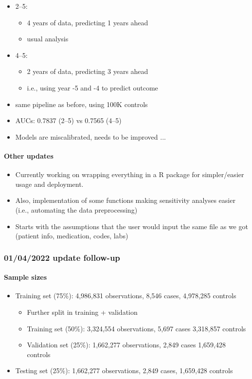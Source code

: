 \documentclass[12pt]{article}
\begin{document}
\begin{itemize}
	\item 2--5: 
	\begin{itemize}
		\item 4 years of data, predicting 1 years ahead
		\item usual analysis
	\end{itemize}
	\item 4--5: 
	\begin{itemize}
		\item 2 years of data, predicting 3 years ahead
		\item i.e., using year -5 and -4 to predict outcome
	\end{itemize}
	\item same pipeline as before, using 100K controls
	\item AUCs: 0.7837 (2--5) vs 0.7565 (4--5)
	\item Models are miscalibrated, needs to be improved ... 
\end{itemize}




\paragraph*{Other updates}

\begin{itemize}
	\item Currently working on wrapping everything in a R package
	for simpler/easier usage and deployment.
	\item Also, implementation of some functions making sensitivity analyses easier (i.e., automating the data preprocessing)
	\item Starts with the assumptions that the user would input the same file
	as we got (patient info, medication, codes, labs)
\end{itemize}




\pagebreak
\subsubsection*{01/04/2022 update follow-up}

\paragraph*{Sample sizes}
\begin{itemize}
	\item Training set (75\%): 4,986,831 observations, 8,546 cases, 4,978,285 controls
	\begin{itemize}
		\item Further split in training + validation
		\item Training set (50\%): 3,324,554 observations, 5,697 cases 3,318,857 controls
		\item Validation set (25\%): 1,662,277 observations, 2,849 cases 1,659,428 controls
	\end{itemize}
	\item Testing set (25\%): 1,662,277 observations, 2,849 cases, 1,659,428 controls
\end{itemize}
\end{document}
